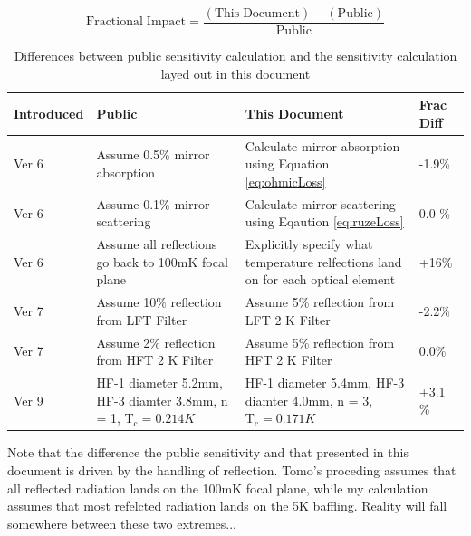 \documentclass[12pt, titlepage]{article} %
\begin{document}
\begin{equation}
	\mathrm{Fractional \; Impact} = \frac{(\mathrm{This \; Document}) - (\mathrm{Public})}{\mathrm{Public}}
\end{equation}

\begin{table}[H]
\centering
	\begin{tabularx}{\textwidth}{|| X | X | X | X ||}
	\hline
	\textbf{Introduced} & \textbf{Public} & \textbf{This Document} & \textbf{Frac Diff} \\
	\hline
	\hline
	Ver 6 & Assume 0.5\% mirror absorption & Calculate mirror absorption using Equation \ref{eq:ohmicLoss} & -1.9\% \\
	\hline
	Ver 6 & Assume 0.1\% mirror scattering & Calculate mirror scattering using Eqaution \ref{eq:ruzeLoss} & 0.0 \% \\
	\hline
	Ver 6 & Assume all reflections go back to 100mK focal plane & Explicitly specify what temperature relfections land on for each optical element & +16\% \\
	\hline
	Ver 7 & Assume 10\% reflection from LFT  Filter & Assume 5\% reflection from LFT 2 K Filter & -2.2\% \\
	\hline
	Ver 7 & Assume 2\% reflection from HFT 2 K Filter & Assume 5\% reflection from HFT 2 K Filter & 0.0\% \\
	\hline
	Ver 9 & HF-1 diameter 5.2mm, HF-3 diamter 3.8mm, n = 1, $\mathrm{T_{c}} = 0.214 K$ & HF-1 diameter 5.4mm, HF-3 diamter 4.0mm, n = 3, $\mathrm{T_{c}} = 0.171 K$ & +3.1 \% \\
	\hline
	\end{tabularx}
\caption{Differences between public sensitivity calculation and the sensitivity calculation layed out in this document}
\end{table}

	 

Note that the difference the public sensitivity and that presented in this document is driven by the handling of reflection. Tomo's proceding assumes that all reflected radiation lands on the 100mK focal plane, while my calculation assumes that most refelcted radiation lands on the 5K baffling. Reality will fall somewhere between these two extremes...

\clearpage
\fi

\tableofcontents
\newpage


\end{document}
